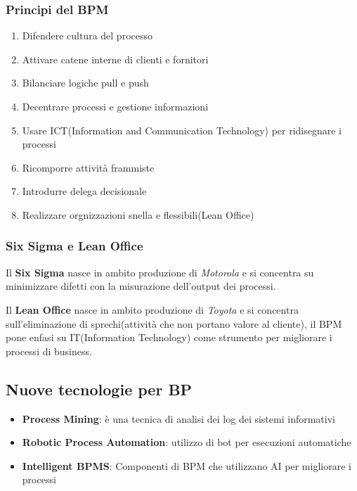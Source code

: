 \subsubsection{Principi del BPM}
\begin{enumerate}
	\item Difendere cultura del processo
	\item Attivare catene interne di clienti e fornitori
	\item Bilanciare logiche pull e push
	\item Decentrare processi e gestione informazioni
	\item Usare ICT(Information and Communication Technology) per ridisegnare i processi
	\item Ricomporre attività frammiste
	\item Introdurre delega decisionale
	\item Realizzare orgnizzazioni snella e flessibili(Lean Office)
\end{enumerate}

\subsubsection{Six Sigma e Lean Office}

Il \textbf{Six Sigma} nasce in ambito produzione di \textit{Motorola} e si concentra
su minimizzare difetti con la misurazione dell'output dei processi.


Il \textbf{Lean Office} nasce in ambito produzione di \textit{Toyota} e si concentra
sull'eliminazione di sprechi(attività che non portano valore al cliente), il BPM
pone enfasi su IT(Information Technology) come strumento per migliorare i processi di business.



\subsection{Nuove tecnologie per BP}

\begin{itemize}
  \item \textbf{Process Mining}: è una tecnica di analisi dei log dei sistemi informativi
  \item \textbf{Robotic Process Automation}: utilizzo di bot per esecuzioni automatiche
  \item \textbf{Intelligent BPMS}: Componenti di BPM che utilizzano AI per migliorare i processi
\end{itemize}





